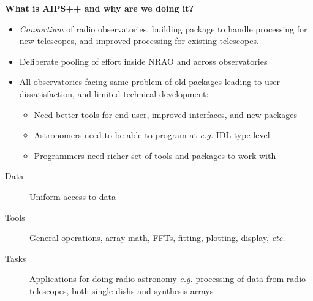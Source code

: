 
\newenvironment{slide}[1]
{\LARGE\begin{center}{\bf #1}\end{center}}{\newpage}

\newcommand{\Ff}[1]{   {\cal F}\left(#1\right)}
\newcommand{\Fi}[1]{   {\cal F}^{-1}\left(#1\right)}

\newcommand{\BR}{{\bf{R}}}
\newcommand{\br}{{\bf{r}}}
\newcommand{\ncel}{\sqrt{1-\ell^2-m^2}}
\newcommand{\x}{{\bf{x}}}
\newcommand{\xp}{{{\bf x}_{\rm p}}}

%

\begin{slide}{What is AIPS++ and why are we doing it?}
\begin{itemize}
\item {\em Consortium} of radio observatories, building package
to handle processing for new telescopes, and improved processing
for existing telescopes.
\item Deliberate pooling of effort inside NRAO and across
observatories
\item All observatories facing same problem of old packages
leading to user dissatisfaction, and limited technical
development:
\begin{itemize}
\item Need better tools for end-user, improved interfaces,
and new packages
\item Astronomers need to be able to program at {\em e.g.}
IDL-type level
\item Programmers need richer set of tools and packages to
work with
\end{itemize}
\end{itemize}
\begin{description}
\item[Data] Uniform access to data
\item[Tools] General operations, array math, FFTs, fitting, plotting,
display, {\em etc.}
\item[Tasks] Applications for doing radio-astronomy {\em e.g.}
processing of data from radio-telescopes, both single dishs and
synthesis arrays
\end{description}
\end{slide}

